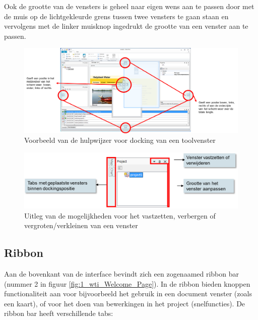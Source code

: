 Ook de grootte van de vensters is geheel naar eigen wens aan te passen door met de muis op de lichtgekleurde grens tussen twee vensters te gaan staan en vervolgens met de linker muisknop ingedrukt de grootte van een venster aan te passen.

\begin{figure}[H]
	\centering
		\includegraphics[width=\textwidth]{figures/chapter_general/wti_Docking_explained.png}
		\caption{Voorbeeld van de hulpwijzer voor docking van een toolvenster}
	\label{fig:3_Docking}
\end{figure}

\begin{figure}[H]
	\centering
		\includegraphics[width=\textwidth]{figures/chapter_general/wti_Pin_UnPin_Explained.png}
		\caption{Uitleg van de mogelijkheden voor het vastzetten, verbergen of vergroten/verkleinen van een venster}
	\label{fig:3_Pin_UnPin}
\end{figure}

\subsection{Ribbon}
	\label{sec:DS_Toolbar}
Aan de bovenkant van de interface bevindt zich een zogenaamed ribbon bar (nummer 2 in figuur \ref{fig:1_wti_Welcome_Page}). In de ribbon bieden knoppen functionaliteit aan voor bijvoorbeeld het gebruik in een document venster (zoals een kaart), of voor het doen van bewerkingen in het project (snelfuncties). De ribbon bar heeft verschillende tabs:

